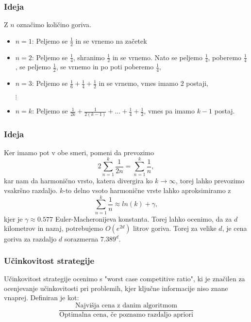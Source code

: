 \documentclass{beamer}
\begin{document}
 \begin{frame}
     \frametitle{Ideja}
     Z $n$ označimo količino goriva.
     \begin{itemize}
        \item $n = 1$: Peljemo se $\frac{1}{2}$ in se vrnemo na začetek
        \item $n = 2$: Peljemo se $\frac{1}{4}$, shranimo $\frac{1}{2}$ in se vrnemo. Nato se peljemo $\frac{1}{4}$, poberemo $\frac{1}{4}$, se peljemo 
        $\frac{1}{2}$, se vrnemo in po poti poberemo $\frac{1}{4}$,
        \item $n = 3$: Peljemo se $\frac{1}{6} + \frac{1}{4} + \frac{1}{2}$ in se vrnemo, vmes imamo $2$ postaji,
        \item[{$\vdots$}]
        \item $n = k$: Peljemo se $\frac{1}{2k} + \frac{1}{2(k-1)} + \dots + \frac{1}{4} + \frac{1}{2}$, vmes pa imamo $k - 1$ postaj.

     \end{itemize}

 \end{frame}
 
 \begin{frame}
    \frametitle{Ideja}
    Ker imamo pot v obe smeri, pomeni da prevozimo  
    $$2\sum_{n=1}^{k} \frac{1}{2n} = \sum_{n=1}^{k} \frac{1}{n},$$
    kar nam da harmonično vrsto, katera divergira ko $k \to \infty$, torej lahko prevozimo 
    vsakršno razdaljo. $k$-to delno vsoto harmonične vrste lahko aproksimiramo z 
    $$\sum_{n=1}^{k} \frac{1}{n} \approx ln(k) + \gamma,$$ kjer je $\gamma \approx 0.577$ Euler-Macheronijeva konstanta.
    Torej lahko ocenimo, da za $d$ kilometrov in nazaj, potrebujemo $O(e^{2d})$ litrov goriva. Torej za velike $d$, je cena 
    goriva za razdaljo $d$ sorazmerna $7.389^d$.
\end{frame}

 \begin{frame}
    \frametitle{Učinkovitost strategije}
    Učinkovitost strategije ocenimo s "worst case competitive ratio", ki je značilen za ocenjevanje učinkovitosti pri 
    problemih, kjer ključne informacije niso znane vnaprej. Definiran je kot: 
    $$\frac{\text{Najvišja cena z danim algoritmom}}{\text{Optimalna cena, če poznamo razdaljo apriori}} $$
\end{frame}
\end{document}
